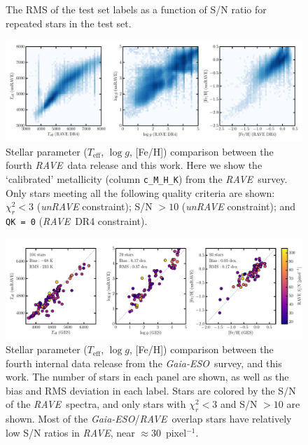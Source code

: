 \documentclass[preprint,trackchanges]{aastex}
\newcommand{\acronym}[1]{{\small{#1}}}
\newcommand{\project}[1]{\textsl{#1}}
\newcommand{\rave}{\project{\acronym{RAVE}}}
\newcommand{\ges}{\project{Gaia-ESO}}
\newcommand{\teff}{T_{\mathrm{eff}}}
\newcommand{\logg}{\log g}
\begin{document}
\begin{figure}[p]
\caption{The RMS of the test set labels as a function of S/N ratio for repeated stars in the test set.\label{fig:test-set-repeats}}
\end{figure}

\begin{figure}[p]
\includegraphics[width=\textwidth]{figures/dr4-comparison.pdf}
\caption{Stellar parameter ($\teff$, $\logg$, [Fe/H]) comparison between the fourth \rave\ data release \citep{Kordopatis_2013} and this work. Here we show the `calibrated' metallicity (column \texttt{c\_M\_H\_K}) from the \rave\ survey. Only stars meeting all the following quality criteria are shown: $\chi_{r}^2 < 3$ (\project{unRAVE} constraint); S/N $> 10$ (\project{unRAVE} constraint); and \texttt{QK = 0} (\rave\ DR4 constraint). \label{fig:rave-dr4-comparison}}
\end{figure}



\begin{figure}[p]
\includegraphics[width=\textwidth]{figures/ges-comparison.pdf}
\caption{Stellar parameter ($\teff$, $\logg$, [Fe/H]) comparison between the fourth internal data release from the \ges\ survey, and this work. The number of stars in each panel are shown, as well as the bias and RMS deviation in each label. Stars are colored by the S/N of the \rave\ spectra, and only stars with $\chi_r^2 < 3$ and S/N $> 10$ are shown.  Most of the \ges/\rave\ overlap stars have relatively low S/N ratios in \rave, near $\approx 30$~pixel$^{-1}$.\label{fig:ges-stellar-parameters}}
\end{figure}
\end{document}
